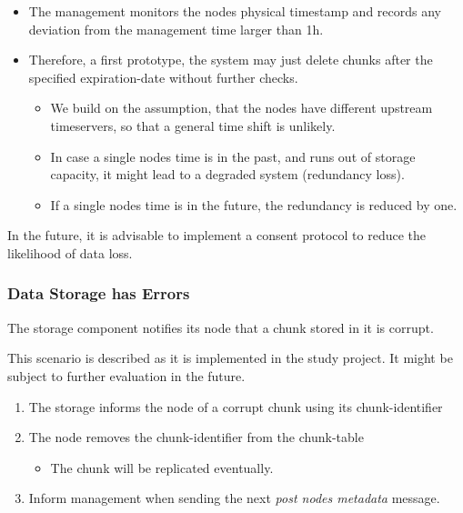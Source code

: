 \begin{itemize}
    \item The \gls{management} monitors the \glspl{node} physical timestamp and records any deviation from the \gls{management} time larger than 1h.
    \item Therefore, a first prototype, the system may just delete \glspl{chunk} after the specified \gls{expiration-date} without further checks.
        \begin{itemize}
            \item We build on the assumption, that the \glspl{node} have different upstream timeservers, so that a general time shift is unlikely.
            \item In case a single \gls{node}s time is in the past, and runs out of storage capacity, it might lead to a degraded system (redundancy loss).
            \item If a single \gls{node}s time is in the future, the redundancy is reduced by one.
        \end{itemize}
\end{itemize}

In the future, it is advisable to implement a consent protocol to reduce the likelihood of data loss.

\subsubsection{Data Storage has Errors}\label{sec:scenario-storage-errors}
The \gls{storage} component notifies its \gls{node} that a \gls{chunk} stored in it is corrupt.

This scenario is described as it is implemented in the study project. It might be subject to further evaluation in the future.

\begin{enumerate}
    \item The \gls{storage} informs the \gls{node} of a corrupt \gls{chunk} using its \gls{chunk-identifier}
    \item The \gls{node} removes the \gls{chunk-identifier} from the \gls{chunk-table}
        \begin{itemize}
            \item The \gls{chunk} will be replicated eventually.
        \end{itemize}
    \item Inform \gls{management} when sending the next \emph{post nodes metadata} message.
\end{enumerate}

